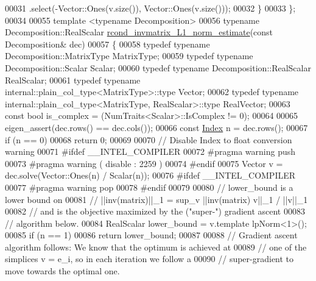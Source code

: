 \begin{DoxyCode}
00031            .select(-Vector::Ones(v.size()), Vector::Ones(v.size()));
00032   \}
00033 \};
00034 
00055 \textcolor{keyword}{template} <\textcolor{keyword}{typename} Decomposition>
00056 \textcolor{keyword}{typename} Decomposition::RealScalar \hyperlink{namespace_eigen_1_1internal_aa3f5b3cfa34df750994a247d4823aa51}{rcond\_invmatrix\_L1\_norm\_estimate}(\textcolor{keyword}{const} 
      Decomposition& dec)
00057 \{
00058   \textcolor{keyword}{typedef} \textcolor{keyword}{typename} Decomposition::MatrixType MatrixType;
00059   \textcolor{keyword}{typedef} \textcolor{keyword}{typename} Decomposition::Scalar Scalar;
00060   \textcolor{keyword}{typedef} \textcolor{keyword}{typename} Decomposition::RealScalar RealScalar;
00061   \textcolor{keyword}{typedef} \textcolor{keyword}{typename} internal::plain\_col\_type<MatrixType>::type Vector;
00062   \textcolor{keyword}{typedef} \textcolor{keyword}{typename} internal::plain\_col\_type<MatrixType, RealScalar>::type RealVector;
00063   \textcolor{keyword}{const} \textcolor{keywordtype}{bool} is\_complex = (NumTraits<Scalar>::IsComplex != 0);
00064 
00065   eigen\_assert(dec.rows() == dec.cols());
00066   \textcolor{keyword}{const} \hyperlink{namespace_eigen_a62e77e0933482dafde8fe197d9a2cfde}{Index} n = dec.rows();
00067   \textcolor{keywordflow}{if} (n == 0)
00068     \textcolor{keywordflow}{return} 0;
00069 
00070   \textcolor{comment}{// Disable Index to float conversion warning}
00071 \textcolor{preprocessor}{#ifdef \_\_INTEL\_COMPILER}
00072 \textcolor{preprocessor}{  #pragma warning push}
00073 \textcolor{preprocessor}{  #pragma warning ( disable : 2259 )}
00074 \textcolor{preprocessor}{#endif}
00075   Vector v = dec.solve(Vector::Ones(n) / Scalar(n));
00076 \textcolor{preprocessor}{#ifdef \_\_INTEL\_COMPILER}
00077 \textcolor{preprocessor}{  #pragma warning pop}
00078 \textcolor{preprocessor}{#endif}
00079 
00080   \textcolor{comment}{// lower\_bound is a lower bound on}
00081   \textcolor{comment}{//   ||inv(matrix)||\_1  = sup\_v ||inv(matrix) v||\_1 / ||v||\_1}
00082   \textcolor{comment}{// and is the objective maximized by the ("super-") gradient ascent}
00083   \textcolor{comment}{// algorithm below.}
00084   RealScalar lower\_bound = v.template lpNorm<1>();
00085   \textcolor{keywordflow}{if} (n == 1)
00086     \textcolor{keywordflow}{return} lower\_bound;
00087 
00088   \textcolor{comment}{// Gradient ascent algorithm follows: We know that the optimum is achieved at}
00089   \textcolor{comment}{// one of the simplices v = e\_i, so in each iteration we follow a}
00090   \textcolor{comment}{// super-gradient to move towards the optimal one.}

\end{DoxyCode}
